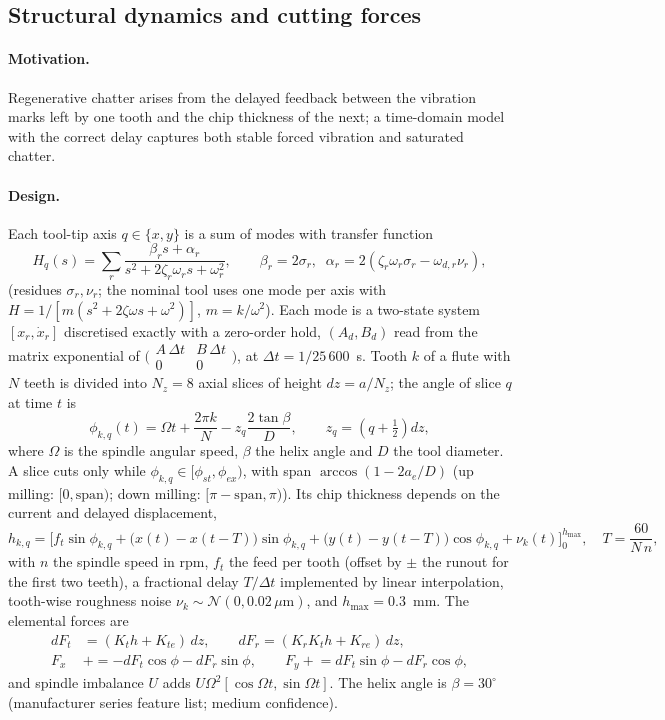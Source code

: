 \documentclass[11pt]{article}
\begin{document}
\subsection{Structural dynamics and cutting forces}
\paragraph{Motivation.} Regenerative chatter arises from the delayed feedback between the vibration marks left by one tooth and the chip thickness of the next; a time-domain model with the correct delay captures both stable forced vibration and saturated chatter.
\paragraph{Design.} Each tool-tip axis $q\in\{x,y\}$ is a sum of modes with transfer function
\begin{equation}
H_q(s)=\sum_{r}\frac{\beta_r s+\alpha_r}{s^2+2\zeta_r\omega_r s+\omega_r^2},\qquad \beta_r=2\sigma_r,\;\;\alpha_r=2(\zeta_r\omega_r\sigma_r-\omega_{d,r}\nu_r),
\end{equation}
(residues $\sigma_r,\nu_r$; the nominal tool uses one mode per axis with $H=1/[m(s^2+2\zeta\omega s+\omega^2)]$, $m=k/\omega^2$). Each mode is a two-state system $[x_r,\dot x_r]$ discretised exactly with a zero-order hold, $(A_d,B_d)$ read from the matrix exponential of $\bigl(\begin{smallmatrix}A\,\Delta t & B\,\Delta t\\ 0&0\end{smallmatrix}\bigr)$, at $\Delta t=1/25\,600$~s.
Tooth $k$ of a flute with $N$ teeth is divided into $N_z{=}8$ axial slices of height $dz=a/N_z$; the angle of slice $q$ at time $t$ is
\begin{equation}
\phi_{k,q}(t)=\Omega t+\frac{2\pi k}{N}-z_q\frac{2\tan\beta}{D},\qquad z_q=(q+\tfrac12)dz,
\end{equation}
where $\Omega$ is the spindle angular speed, $\beta$ the helix angle and $D$ the tool diameter. A slice cuts only while $\phi_{k,q}\in[\phi_{st},\phi_{ex})$, with span $\arccos(1-2a_e/D)$ (up milling: $[0,\text{span})$; down milling: $[\pi-\text{span},\pi)$). Its chip thickness depends on the current and delayed displacement,
\begin{equation}
h_{k,q}=\Big[f_t\sin\phi_{k,q}+\big(x(t)-x(t-T)\big)\sin\phi_{k,q}+\big(y(t)-y(t-T)\big)\cos\phi_{k,q}+\nu_k(t)\Big]_{0}^{h_{\max}},\quad T=\frac{60}{N\,n},
\end{equation}
with $n$ the spindle speed in rpm, $f_t$ the feed per tooth (offset by $\pm$ the runout for the first two teeth), a fractional delay $T/\Delta t$ implemented by linear interpolation, tooth-wise roughness noise $\nu_k\sim\mathcal N(0,0.02\,\mu\text{m})$, and $h_{\max}=0.3$~mm. The elemental forces are
\begin{align}
dF_t&=(K_t h+K_{te})\,dz,\qquad dF_r=(K_rK_t h+K_{re})\,dz,\\
F_x&\mathrel{+}=-dF_t\cos\phi-dF_r\sin\phi,\qquad F_y\mathrel{+}=dF_t\sin\phi-dF_r\cos\phi,
\end{align}
and spindle imbalance $U$ adds $U\Omega^2[\cos\Omega t,\sin\Omega t]$. The helix angle is $\beta=30^\circ$ (manufacturer series feature list; medium confidence).
\end{document}
